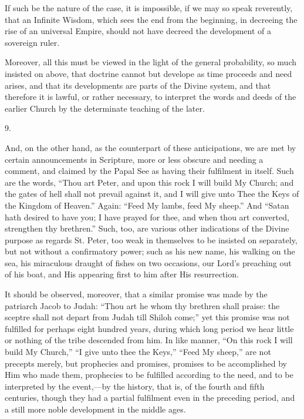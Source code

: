 If such be the nature of the case, it is impossible,
if we may so speak reverently, that an Infinite Wisdom,
which sees the end from the beginning, in decreeing the
rise of an universal Empire, should not have decreed the
development of a sovereign ruler.

Moreover, all this must be viewed in the light of the
general probability, so much insisted on above, that
doctrine cannot but develope as time proceeds and need
arises, and that its developments are parts of the Divine
system, and that therefore it is lawful, or rather
necessary, to interpret the words and deeds of the
earlier Church by the determinate teaching of the later.

9.

And, on the other hand, as the counterpart of these
anticipations, we are met by certain announcements in
Scripture, more or less obscure and needing a comment,
and claimed by the Papal See as having their fulfilment
in itself. Such are the words, ``Thou art Peter, and
upon this rock I will build My Church; and the gates of
hell shall not prevail against it, and I will give unto
Thee the Keys of the Kingdom of Heaven.'' Again:
``Feed My lambs, feed My sheep.'' And ``Satan
hath desired to have you; I have prayed for thee, and
when thou art converted, strengthen thy brethren.''
Such, too, are various other indications of the Divine
purpose as regards St. Peter, too weak in themselves to
be insisted on separately, but not without a confirmatory
power; such as his new name, his walking on the sea, his
miraculous draught of fishes on two occasions, our Lord's
preaching out of his boat, and His appearing first to him
after His resurrection.

It should be observed, moreover, that a similar
promise was made by the patriarch Jacob to Judah:
``Thou art he whom thy brethren shall praise: the
sceptre shall not depart from Judah till Shiloh
come;'' yet this promise was not fulfilled for
perhaps eight hundred years, during which long period we
hear little or nothing of the tribe descended from him.
In like manner, ``On this rock I will build My
Church,'' ``I give unto thee the Keys,''
``Feed My sheep,'' are not precepts merely, but
prophecies and promises, promises to be accomplished by
Him who made them, prophecies to be fulfilled according
to the need, and to be interpreted by the event,—by
the history, that is, of the fourth and fifth centuries,
though they had a partial fulfilment even in the
preceding period, and a still more noble development in
the middle ages.

